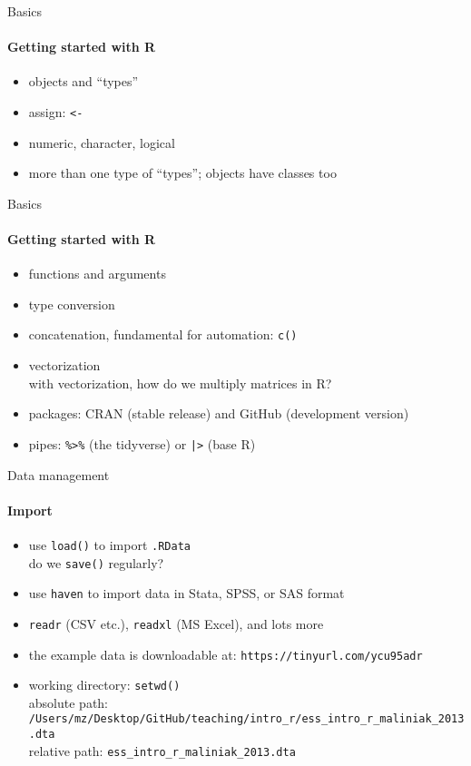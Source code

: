 \documentclass{beamer}
\begin{document}
\begin{frame}{Basics}
\framesubtitle{Getting started with R}
\begin{itemize}
    \item objects and ``types''
    \item assign: \texttt{<-}
    \item numeric, character, logical
    \item more than one type of ``types''; objects have classes too
\end{itemize}
\end{frame}

\begin{frame}{Basics}
\framesubtitle{Getting started with R}
\begin{itemize}
    \item functions and arguments
    \item type conversion
    \item concatenation, fundamental for automation: \texttt{c()}
    \item vectorization\\ with vectorization, how do we multiply matrices in R?
    \item packages: CRAN (stable release) and GitHub (development version)
    \item pipes: \texttt{\%>\%} (the tidyverse) or \texttt{|>} (base R)
\end{itemize}
\end{frame}    

\begin{frame}{Data management}
\framesubtitle{Import}
\begin{itemize}
    \item use \texttt{load()} to import \texttt{.RData}\\ do we \texttt{save()} regularly?
    \item use \texttt{haven} to import data in Stata, SPSS, or SAS format
    \item \texttt{readr} (CSV etc.), \texttt{readxl} (MS Excel), and lots more
    \item the example data is downloadable at: \texttt{https://tinyurl.com/ycu95adr}
    \item working directory: \texttt{setwd()}\\ absolute path: \texttt{/Users/mz/Desktop/GitHub/teaching/intro\_r/ess\_intro\_r\_maliniak\_2013.dta}\\ relative path: \texttt{ess\_intro\_r\_maliniak\_2013.dta}
\end{itemize}
\end{frame}
\end{document}
